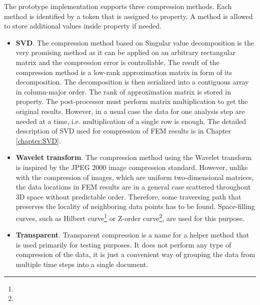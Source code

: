The prototype implementation supports three compression methods. Each method is identified by a token that is assigned to  property. A method is allowed to store additional values inside  property if needed.

\begin{itemize}
    
    \item \textbf{SVD}. The compression method based on Singular value decomposition is the very promising method as it can be applied on an arbitrary rectangular matrix and the compression error is controllable. The result of the compression method is a low-rank approximation matrix in form of its decomposition. The decomposition is then serialized into a contiguous array in column-major order. The rank of approximation matrix is stored in  property. The post-processor must perform matrix multiplication to get the original results. However, in a usual case the data for one analysis step are needed at a time, i.e. multiplication of a single row is enough. The detailed description of SVD used for compression of FEM results is in Chapter \ref{chapter:SVD}.

    \item \textbf{Wavelet transform}. The compression method using the Wavelet transform is inspired by the JPEG 2000 image compression standard. However, unlike with the compression of images, which are uniform two-dimensional matrices, the data locations in FEM results are in a general case scattered throughout 3D space without predictable order. Therefore, some traversing path that preserves the locality of neighboring data points has to be found. Space-filling curves, such as Hilbert curve\footnote{} or Z-order curve\footnote{}, are used for this purpose.
    
    \item \textbf{Transparent}. Transparent compression is a name for a helper method that is used primarily for testing purposes. It does not perform any type of compression of the data, it is just a convenient way of grouping the data from multiple time steps into a single document.

\end{itemize}

